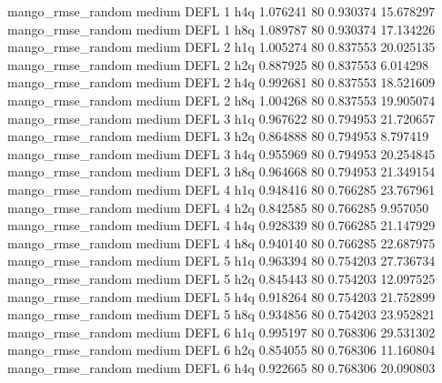 mango_rmse_random     medium     DEFL                 1                  h4q  1.076241 80       0.930374          15.678297
mango_rmse_random     medium     DEFL                 1                  h8q  1.089787 80       0.930374          17.134226
mango_rmse_random     medium     DEFL                 2                  h1q  1.005274 80       0.837553          20.025135
mango_rmse_random     medium     DEFL                 2                  h2q  0.887925 80       0.837553           6.014298
mango_rmse_random     medium     DEFL                 2                  h4q  0.992681 80       0.837553          18.521609
mango_rmse_random     medium     DEFL                 2                  h8q  1.004268 80       0.837553          19.905074
mango_rmse_random     medium     DEFL                 3                  h1q  0.967622 80       0.794953          21.720657
mango_rmse_random     medium     DEFL                 3                  h2q  0.864888 80       0.794953           8.797419
mango_rmse_random     medium     DEFL                 3                  h4q  0.955969 80       0.794953          20.254845
mango_rmse_random     medium     DEFL                 3                  h8q  0.964668 80       0.794953          21.349154
mango_rmse_random     medium     DEFL                 4                  h1q  0.948416 80       0.766285          23.767961
mango_rmse_random     medium     DEFL                 4                  h2q  0.842585 80       0.766285           9.957050
mango_rmse_random     medium     DEFL                 4                  h4q  0.928339 80       0.766285          21.147929
mango_rmse_random     medium     DEFL                 4                  h8q  0.940140 80       0.766285          22.687975
mango_rmse_random     medium     DEFL                 5                  h1q  0.963394 80       0.754203          27.736734
mango_rmse_random     medium     DEFL                 5                  h2q  0.845443 80       0.754203          12.097525
mango_rmse_random     medium     DEFL                 5                  h4q  0.918264 80       0.754203          21.752899
mango_rmse_random     medium     DEFL                 5                  h8q  0.934856 80       0.754203          23.952821
mango_rmse_random     medium     DEFL                 6                  h1q  0.995197 80       0.768306          29.531302
mango_rmse_random     medium     DEFL                 6                  h2q  0.854055 80       0.768306          11.160804
mango_rmse_random     medium     DEFL                 6                  h4q  0.922665 80       0.768306          20.090803

